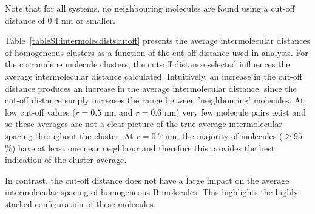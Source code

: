 
Note that for all systems, no neighbouring molecules are found using a cut-off distance of 0.4 nm or smaller.


Table~\ref{tableSI:intermolecdistscutoff} presents the average intermolecular distances of homogeneous clusters as a function of the cut-off distance used in analysis. For the corranulene molecule clusters, the cut-off distance selected influences the average intermolecular distance calculated.  Intuitively, an increase in the cut-off distance produces an increase in the average intermolecular distance, since the cut-off distance simply increases the range between 'neighbouring' molecules. At low cut-off values ($r = 0.5$ nm and $r = 0.6$ nm) very few molecule pairs exist and so these averages are not a clear picture of the true average intermolecular spacing throughout the cluster.  At $r = 0.7$ nm, the majority of molecules ($\ge 95$\%) have at least one near neighbour and therefore this provides the best indication of the cluster average.

In contrast, the cut-off distance does not have a large impact on the average intermolecular spacing of homogeneous B molecules. This highlights the highly stacked configuration of these molecules.




